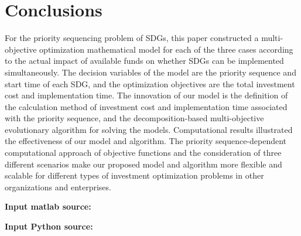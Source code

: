 \documentclass[10pt]{mcmthesis}
\begin{document}
\section{Conclusions}
For the priority sequencing problem of SDGs, this paper constructed a multi-objective optimization mathematical model for each of the three cases according to the actual impact of available funds on whether SDGs can be implemented simultaneously. The decision variables of the model are the priority sequence and start time of each SDG, and the optimization objectives are the total investment cost and implementation time. The innovation of our model is the definition of the calculation method of investment cost and implementation time associated with the priority sequence, and the decomposition-based multi-objective evolutionary algorithm for solving the models. Computational results illustrated the effectiveness of our model and algorithm. The priority sequence-dependent computational approach of objective functions and the consideration of three different scenarios make our proposed model and algorithm more flexible and scalable for different types of investment optimization problems in other organizations and enterprises.


\clearpage



\clearpage
\begin{appendices}


\label{code.ahp}

\textbf{\textcolor[rgb]{0.98,0.00,0.00}{Input matlab source:}}



\textcolor[rgb]{0.98,0.00,0.00}{\textbf{Input Python source:}}


\end{appendices}
\end{document}
